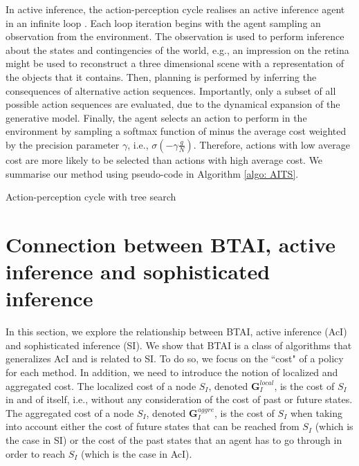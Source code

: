 \documentclass[twoside,11pt]{article}
\begin{document}
In active inference, the action-perception cycle realises an active inference agent in an infinite loop \citep{Simul_AI}. Each loop iteration begins with the agent sampling an observation from the environment. The observation is used to perform inference about the states and contingencies of the world, e.g., an impression on the retina might be used to reconstruct a three dimensional scene with a representation of the objects that it contains. Then, planning is performed by inferring the consequences of alternative action sequences. Importantly, only a subset of all possible action sequences are evaluated, due to the dynamical expansion of the generative model. Finally, the agent selects an action to perform in the environment by sampling a softmax function of minus the average cost weighted by the precision parameter $\gamma$, i.e., $\sigma(-\gamma \frac{g}{N})$. Therefore, actions with low average cost are more likely to be selected than actions with high average cost. We summarise our method using pseudo-code in Algorithm \ref{algo: AITS}.

\begin{algorithm}[H]
\label{algo: AITS}
\SetAlgoLined
 \caption{Action-perception cycle with tree search}
\end{algorithm}

\section{Connection between BTAI, active inference and sophisticated inference} \label{sec:aits_ai_sai}

In this section, we explore the relationship between BTAI, active inference (AcI) and sophisticated inference (SI). We show that BTAI is a class of algorithms that generalizes AcI and is related to SI. To do so, we focus on the ``cost" of a policy for each method. In addition, we need to introduce the notion of localized and aggregated cost. The localized cost of a node $S_I$, denoted $\bm{G}_I^{local}$, is the cost of $S_I$ in and of itself, i.e., without any consideration of the cost of past or future states. The aggregated cost of a node $S_I$, denoted $\bm{G}_I^{aggre}$, is the cost of $S_I$ when taking into account either the cost of future states that can be reached from $S_I$ (which is the case in SI) or the cost of the past states that an agent has to go through in order to reach $S_I$ (which is the case in AcI).
\end{document}
